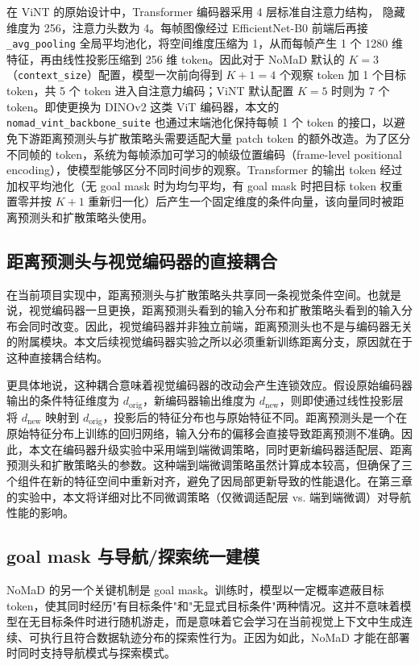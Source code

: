 在 ViNT\cite{vint2023} 的原始设计中，Transformer\cite{transformer2017} 编码器采用 4 层标准自注意力结构，
隐藏维度为 256，注意力头数为 4。每帧图像经过 EfficientNet-B0\cite{efficientnet2019} 前端后再接 \texttt{\_avg\_pooling} 全局平均池化，将空间维度压缩为 1，从而每帧产生 1 个 1280 维特征，再由线性投影压缩到 256 维 token。因此对于 NoMaD 默认的 $K = 3$（\texttt{context\_size}）配置，模型一次前向得到 $K + 1 = 4$ 个观察 token 加 1 个目标 token，共 5 个 token 进入自注意力编码；ViNT 默认配置 $K = 5$ 时则为 7 个 token。即使更换为 DINOv2 这类 ViT 编码器，本文的 \texttt{nomad\_vint\_backbone\_suite} 也通过末端池化保持每帧 1 个 token 的接口，以避免下游距离预测头与扩散策略头需要适配大量 patch token 的额外改造。为了区分不同帧的 token，系统为每帧添加可学习的帧级位置编码（frame-level positional encoding），使模型能够区分不同时间步的观察。Transformer 的输出 token 经过加权平均池化（无 goal mask 时为均匀平均，有 goal mask 时把目标 token 权重置零并按 $K+1$ 重新归一化）后产生一个固定维度的条件向量，该向量同时被距离预测头和扩散策略头使用。

\subsection{距离预测头与视觉编码器的直接耦合}

在当前项目实现中，距离预测头与扩散策略头共享同一条视觉条件空间。也就是说，视觉编码器一旦更换，距离预测头看到的输入分布和扩散策略头看到的输入分布会同时改变。因此，视觉编码器并非独立前端，距离预测头也不是与编码器无关的附属模块。本文后续视觉编码器实验之所以必须重新训练距离分支，原因就在于这种直接耦合结构。

更具体地说，这种耦合意味着视觉编码器的改动会产生连锁效应。假设原始编码器输出的条件特征维度为 $d_{\text{orig}}$，新编码器输出维度为 $d_{\text{new}}$，则即使通过线性投影层将 $d_{\text{new}}$ 映射到 $d_{\text{orig}}$，投影后的特征分布也与原始特征不同。距离预测头是一个在原始特征分布上训练的回归网络，输入分布的偏移会直接导致距离预测不准确。因此，本文在编码器升级实验中采用端到端微调策略，同时更新编码器适配层、距离预测头和扩散策略头的参数。这种端到端微调策略虽然计算成本较高，但确保了三个组件在新的特征空间中重新对齐，避免了因局部更新导致的性能退化。在第三章的实验中，本文将详细对比不同微调策略（仅微调适配层 vs. 端到端微调）对导航性能的影响。

\subsection{goal mask 与导航/探索统一建模}

NoMaD 的另一个关键机制是 goal mask。训练时，模型以一定概率遮蔽目标 token，使其同时经历"有目标条件"和"无显式目标条件"两种情况\cite{nomad2023}。这并不意味着模型在无目标条件时进行随机游走，而是意味着它会学习在当前视觉上下文中生成连续、可执行且符合数据轨迹分布的探索性行为。正因为如此，NoMaD 才能在部署时同时支持导航模式与探索模式。

